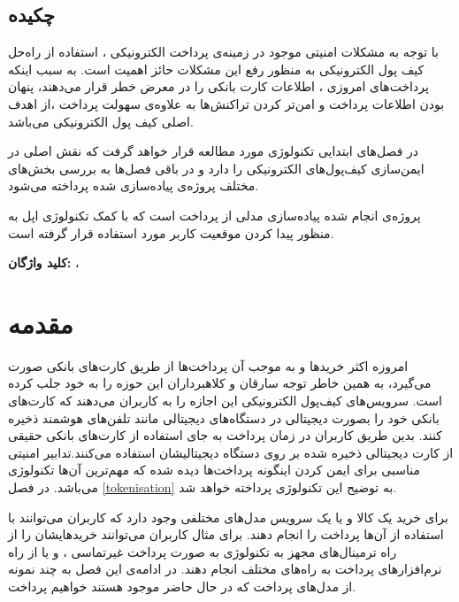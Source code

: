 \documentclass[oneside]{report}
\begin{document}
\newcommand\addHarfi{\harfi{MyC}\addtocounter{MyC}{1}\ }
\setcounter{MyC}{1}
 \section*{چکیده}
\Large \noindent
با توجه به مشکلات امنیتی موجود در زمینه‌ی پرداخت الکترونیکی ، استفاده از راه‌حل‌ کیف پول الکترونیکی به منظور رفع این مشکلات حائز اهمیت است. به سبب اینکه پرداخت‌های امروزی ، اطلاعات کارت بانکی را در معرض خطر قرار می‌دهند، پنهان بودن اطلاعات پرداخت و امن‌تر کردن تراکنش‌ها به علاوه‌ی سهولت پرداخت ،از اهدف اصلی کیف پول ‌الکترونیکی می‌باشد.

\noindent
در فصل‌های ابتدایی تکنولوژی‌
	{\normalsize {}}
مورد مطالعه قرار خواهد گرفت که نقش اصلی در ایمن‌سازی کیف‌پول‌های الکترونیکی را دارد و در باقی فصل‌ها به بررسی بخش‌های مختلف پروژه‌ی پیاده‌سازی شده پرداخته می‌شود.

\noindent
پروژه‌ی انجام شده پیاده‌سازی مدلی از پرداخت است که با کمک تکنولوژی
{\normalsize {}}
اپل به منظور پیدا کردن موقعیت کاربر مورد استفاده قرار گرفته است.


\vspace*{1cm}
\noindent
\textbf{کلید واژگان: } 
{\large {}} ، {\large {}} 

{\let\cleardoublepage\clearpage 
	\tableofcontents
}
	\chapter{مقدمه}\label{introduction}
		امروزه اکثر خرید‌ها و به موجب آن پرداخت‌ها از طریق کارت‌های بانکی صورت می‌گیرد، به همین خاطر توجه سارقان و کلاهبرداران این حوزه را به خود جلب کرده است. سرویس‌های کیف‌پول الکترونیکی این اجازه را به کاربران می‌دهند که کارت‌های بانکی خود را بصورت دیجیتالی در دستگاه‌های دیجیتالی مانند تلفن‌های هوشمند ذخیره کنند. بدین طریق کاربران در زمان پرداخت به جای استفاده از کارت‌های بانکی حقیقی از کارت دیجیتالی ذخیره شده بر روی دستگاه دیجیتالیشان استفاده می‌کنند.تدابیر امنیتی مناسبی برای ایمن کردن اینگونه پرداخت‌ها دیده شده که  مهم‌ترین آن‌ها تکنولوژی  {\normalsize {}}  می‌باشد. در فصل \ref{tokenisation} به توضیح این تکنولوژی پرداخته خواهد شد.
		
		برای خرید یک کالا و یا یک سرویس مدل‌های مختلفی وجود دارد که کاربران می‌توانند با استفاده از آن‌ها پرداخت را انجام دهند. برای مثال کاربران می‌توانند خریدهایشان را از راه ترمینال‌های مجهز به تکنولوژی 
			{\normalsize {}}
		به صورت پرداخت غیرتماسی
			  ، و یا از راه نرم‌افزار‌های پرداخت به راه‌های مختلف انجام دهند. در ادامه‌ی این فصل به چند نمونه از مدل‌های پرداخت که در حال حاضر موجود هستند خواهیم پرداخت.		
			  
\end{document}
